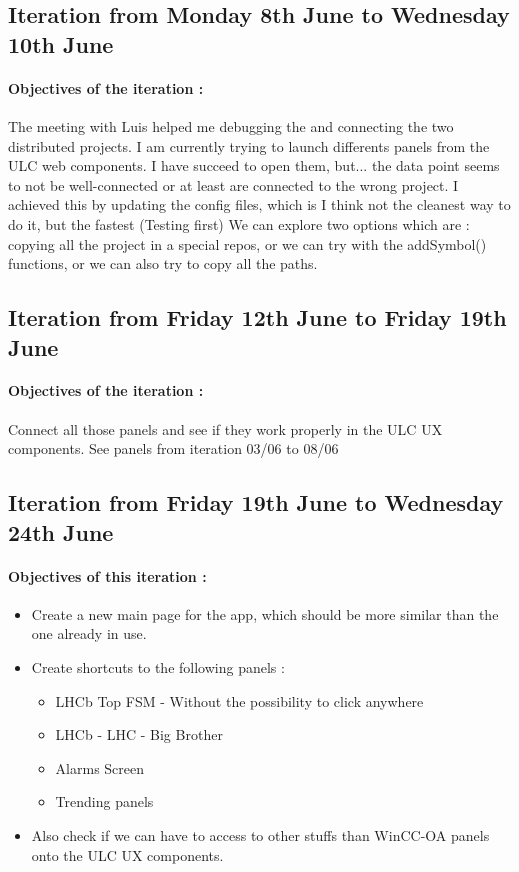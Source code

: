 \documentclass[../main.tex]{subfiles}
\begin{document}
\begin{appendix}
    \subsection{Iteration from Monday 8th June to Wednesday 10th June}
    \paragraph{Objectives of the iteration :}
    The meeting with Luis helped me debugging the and connecting the two distributed projects. I am currently trying to launch differents panels from the ULC web components.
    I have succeed to open them, but... the data point seems to not be well-connected or at least are connected to the wrong project.
    I achieved this by updating the config files, which is I think not the cleanest way to do it, but the fastest (Testing first)
    We can explore two options which are : copying all the project in a special repos, or we can try with the addSymbol() functions, or we can also try to copy all the paths.

    \subsection{Iteration from Friday 12th June to Friday 19th June}
    \paragraph{Objectives of the iteration :}
    Connect all those panels and see if they work properly in the ULC UX components. See panels from iteration 03/06 to 08/06
    \subsection{Iteration from Friday 19th June to Wednesday 24th June}
    \paragraph{Objectives of this iteration :}
    \begin{itemize}
        \item Create a new main page for the app, which should be more similar than the one already in use.
        \item Create shortcuts to the following panels :
        \begin{itemize}
            \item LHCb Top FSM - Without the possibility to click anywhere
            \item LHCb - LHC - Big Brother
            \item Alarms Screen
            \item Trending panels
        \end{itemize}
        \item Also check if we can have to access to other stuffs than WinCC-OA panels onto the ULC UX components.
    \end{itemize}

\end{appendix}
\end{document}
